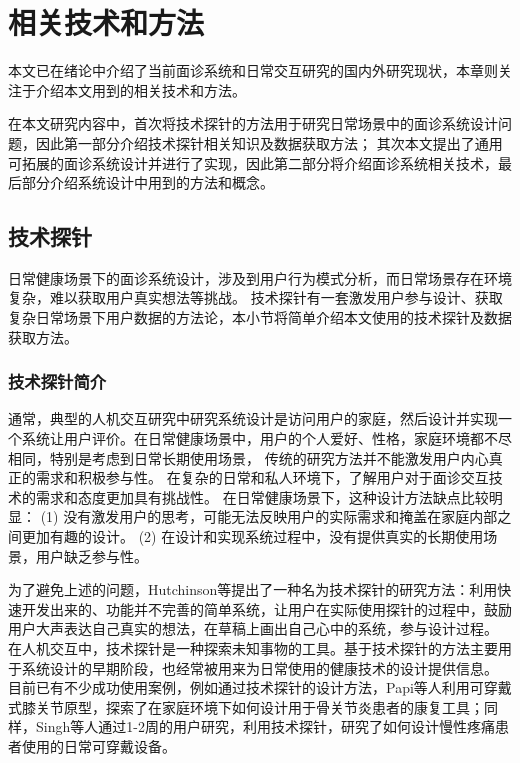 \chapter{相关技术和方法}
本文已在绪论中介绍了当前面诊系统和日常交互研究的国内外研究现状，本章则关注于介绍本文用到的相关技术和方法。

在本文研究内容中，首次将技术探针的方法用于研究日常场景中的面诊系统设计问题，因此第一部分介绍技术探针相关知识及数据获取方法；
其次本文提出了通用可拓展的面诊系统设计并进行了实现，因此第二部分将介绍面诊系统相关技术，最后部分介绍系统设计中用到的方法和概念。

\section{技术探针}
日常健康场景下的面诊系统设计，涉及到用户行为模式分析，而日常场景存在环境复杂，难以获取用户真实想法等挑战。
技术探针有一套激发用户参与设计、获取复杂日常场景下用户数据的方法论，本小节将简单介绍本文使用的技术探针及数据获取方法。
\subsection{技术探针简介}


通常，典型的人机交互研究中研究系统设计是访问用户的家庭，然后设计并实现一个系统让用户评价。在日常健康场景中，用户的个人爱好、性格，家庭环境都不尽相同，特别是考虑到日常长期使用场景，
传统的研究方法并不能激发用户内心真正的需求和积极参与性。
在复杂的日常和私人环境下，了解用户对于面诊交互技术的需求和态度更加具有挑战性。
在日常健康场景下，这种设计方法缺点比较明显\cite{Hutchinson2003Technology}：
(1) 没有激发用户的思考，可能无法反映用户的实际需求和掩盖在家庭内部之间更加有趣的设计。
(2) 在设计和实现系统过程中，没有提供真实的长期使用场景，用户缺乏参与性。

为了避免上述的问题，Hutchinson等\cite{Hutchinson2003Technology}提出了一种名为技术探针的研究方法：利用快速开发出来的、功能并不完善的简单系统，让用户在实际使用探针的过程中，鼓励用户大声表达自己真实的想法，在草稿上画出自己心中的系统，参与设计过程。
在人机交互中，技术探针是一种探索未知事物的工具。基于技术探针的方法主要用于系统设计的早期阶段\cite{turmo2020training}，也经常被用来为日常使用的健康技术的设计提供信息。
目前已有不少成功使用案例，例如通过技术探针的设计方法，Papi等人\cite{papi2015knee}利用可穿戴式膝关节原型，探索了在家庭环境下如何设计用于骨关节炎患者的康复工具；同样，Singh等人\cite{singh2017supporting}通过1-2周的用户研究，利用技术探针，研究了如何设计慢性疼痛患者使用的日常可穿戴设备。

